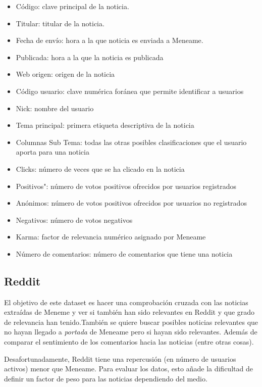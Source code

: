\documentclass[a4paper,12pt]{article}
\begin{document}
 
\begin{itemize}

\item C\'odigo: clave principal de la noticia.
\item Titular: titular de la noticia.
\item Fecha de env\'io: hora a la que noticia es enviada a Meneame.
\item Publicada: hora a la que la noticia es publicada
\item Web origen: origen de la noticia
\item C\'odigo usuario: clave num\'erica for\'anea que permite identificar a usuarios
\item Nick: nombre del usuario
\item Tema principal: primera etiqueta descriptiva de la noticia
\item Columnas Sub Tema: todas las otras posibles clasificaciones que el usuario aporta para una noticia
\item  Clicks: n\'umero de veces que se ha clicado en la noticia
\item Positivos": n\'umero de votos positivos ofrecidos por usuarios registrados
\item An\'onimos: n\'umero de votos positivos ofrecidos por usuarios no registrados
\item Negativos: n\'umero de votos negativos
\item Karma: factor de relevancia num\'erico asignado por Meneame
\item N\'umero de comentarios: n\'umero de comentarios que tiene una noticia

\end{itemize}


\subsection{Reddit}

El objetivo de este dataset es hacer una comprobaci\'on cruzada con las noticias extra\'idas de Meneme y ver si tambi\'en han sido relevantes en Reddit y que grado de relevancia han tenido.Tambi\'en se quiere buscar posibles noticias relevantes que no hayan llegado a {\itshape portada} de Meneame pero si hayan sido relevantes. Adem\'as de comparar el sentimiento de los comentarios hacia las noticias (entre otras cosas).

Desafortunadamente, Reddit tiene una repercusi\'on (en n\'umero de usuarios activos) menor que Meneame. Para evaluar los datos, esto a\~nade la dificultad de definir un factor de peso para las noticias dependiendo del medio.
\end{document}
